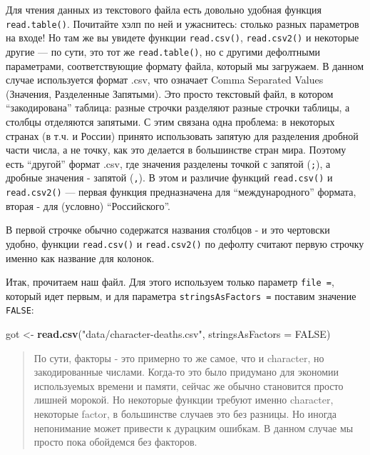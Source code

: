 \documentclass[]{book}
\newenvironment{Shaded}{\begin{snugshade}}{\end{snugshade}}
\newcommand{\DataTypeTok}[1]{\textcolor[rgb]{0.13,0.29,0.53}{#1}}
\newcommand{\KeywordTok}[1]{\textcolor[rgb]{0.13,0.29,0.53}{\textbf{#1}}}
\newcommand{\NormalTok}[1]{#1}
\newcommand{\OtherTok}[1]{\textcolor[rgb]{0.56,0.35,0.01}{#1}}
\newcommand{\StringTok}[1]{\textcolor[rgb]{0.31,0.60,0.02}{#1}}
\begin{document}
Для чтения данных из текстового файла есть довольно удобная функция \texttt{read.table()}. Почитайте хэлп по ней и ужаснитесь: столько разных параметров на входе! Но там же вы увидете функции \texttt{read.csv()}, \texttt{read.csv2()} и некоторые другие --- по сути, это тот же \texttt{read.table()}, но с другими дефолтными параметрами, соответствующие формату файла, который мы загружаем. В данном случае используется формат .csv, что означает Comma Separated Values (Значения, Разделенные Запятыми). Это просто текстовый файл, в котором ``закодирована'' таблица: разные строчки разделяют разные строчки таблицы, а столбцы отделяются запятыми. С этим связана одна проблема: в некоторых странах (в т.ч. и России) принято использовать запятую для разделения дробной части числа, а не точку, как это делается в большинстве стран мира. Поэтому есть ``другой'' формат .csv, где значения разделены точкой с запятой (\texttt{;}), а дробные значения - запятой (\texttt{,}). В этом и различие функций \texttt{read.csv()} и \texttt{read.csv2()} --- первая функция предназначена для ``международного'' формата, вторая - для (условно) ``Российского''.

В первой строчке обычно содержатся названия столбцов - и это чертовски удобно, функции \texttt{read.csv()} и \texttt{read.csv2()} по дефолту считают первую строчку именно как название для колонок.

Итак, прочитаем наш файл. Для этого используем только параметр \texttt{file\ =}, который идет первым, и для параметра \texttt{stringsAsFactors\ =} поставим значение \texttt{FALSE}:

\begin{Shaded}
\begin{Highlighting}[]
\NormalTok{got <-}\StringTok{ }\KeywordTok{read.csv}\NormalTok{(}\StringTok{"data/character-deaths.csv"}\NormalTok{, }\DataTypeTok{stringsAsFactors =} \OtherTok{FALSE}\NormalTok{)}
\end{Highlighting}
\end{Shaded}

\begin{quote}
По сути, факторы - это примерно то же самое, что и character, но закодированные числами. Когда-то это было придумано для экономии используемых времени и памяти, сейчас же обычно становится просто лишней морокой. Но некоторые функции требуют именно character, некоторые factor, в большинстве случаев это без разницы. Но иногда непонимание может привести к дурацким ошибкам. В данном случае мы просто пока обойдемся без факторов.
\end{quote}
\end{document}
